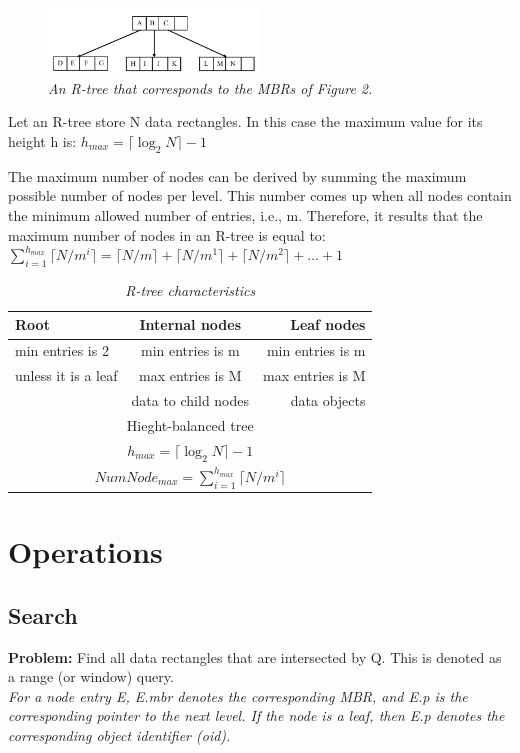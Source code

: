 \documentclass{article}
\begin{document}
\begin{figure}[h]
\centering
\includegraphics[width=0.5\textwidth]{1.3.png}
\caption{\textit{An R-tree that corresponds to the MBRs of Figure 2.}}
\label{fig:1.3}
\end{figure}

Let an R-tree store N data rectangles. In this case the maximum value for its height h is: $h_{max} = \lceil \log_2 N \rceil - 1$ \par
The maximum number of nodes can be derived by summing the maximum
possible number of nodes per level.
This number comes up when all nodes contain the minimum allowed number of entries, i.e., m. 
Therefore, it results
that the maximum number of nodes in an R-tree is equal to: $\sum_{i=1}^{h_{max}} \lceil N / m^i \rceil = \lceil N / m \rceil + \lceil N / m^1 \rceil + \lceil N / m^2 \rceil + \dots + 1$\par

\begin{table}[h]
    \centering
    \begin{tabular}{lcr}
        \toprule
        Root & Internal nodes & Leaf nodes \\
        \midrule
        min entries is 2 & min entries is m & min entries is m \\
        unless it is a leaf & max entries is M & max entries is M \\
        \midrule
        & data to child nodes & data objects \\
        \midrule
        \multicolumn{3}{c}{Hieght-balanced tree} \\
        \multicolumn{3}{c}{$h_{max} = \lceil \log_2 N \rceil - 1$} \\
        \multicolumn{3}{c}{$NumNode_{max} = \sum_{i=1}^{h_{max}} \lceil N / m^i \rceil$}\\
        \bottomrule
    \end{tabular}
    \caption{\textit{R-tree characteristics}}
\end{table}


\section{Operations}

\subsection{Search}
\textbf{Problem:} Find all data rectangles that are intersected by Q. This is denoted as a range (or window) query.\\
\textit{For a node entry E, E.mbr denotes the corresponding MBR, and E.p is the corresponding pointer to the next level. If the node is a leaf, then E.p denotes the corresponding object identifier (oid).}

\end{document}
